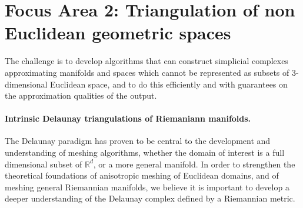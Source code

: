 %

\newcommand{\man}{\mathcal{M}}
\newcommand{\reel}{\mathbb{R}}
\newcommand{\rdee}{\reel^d}
\newcommand{\pts}{P}
\newcommand{\mesh}{\hat{M}}

\newcommand{\ramsay}[1]{\framebox{#1}}%

\section*{Focus Area 2: Triangulation of non Euclidean geometric spaces}

The challenge is to develop algorithms that can construct simplicial
complexes approximating manifolds and spaces which cannot be
represented as subsets of 3-dimensional Euclidean space, and to do
this efficiently and with guarantees on the approximation qualities of
the output. %

\paragraph{Intrinsic Delaunay triangulations of Riemaniann manifolds.}

The Delaunay paradigm has proven to be central to the development and
understanding of meshing algorithms, whether the domain of interest is
a full dimensional subset of $\rdee$, or a more general manifold. In
order to strengthen the theoretical foundations of anisotropic meshing of
Euclidean domains, and of meshing general Riemannian manifolds, we
believe it is important to develop a deeper understanding of the
Delaunay complex defined by a Riemannian metric.
%


